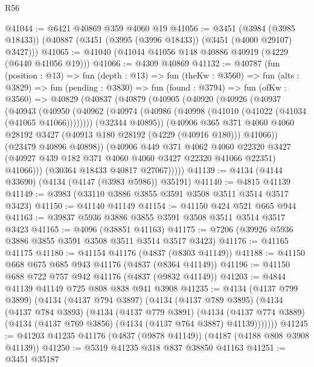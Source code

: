 \begin{lexlean}{R56}
\begin{coremodule}
@41044 := @6421 @40869 @359 @4060 @19
@41056 := @3451
    (@3984 (@3985 @18433))
    (@40887 (@3451 (@3995 (@3996 @18433)) (@3451 (@4000 @29107) @3427)))
@41065 := @41040 (@41044 @41056 @148 @40886 @40919 (@4229 (@6440 @41056 @19)))
@41066 := @4309 @40869
@41132 := @40787
    (fun (position : @13) =>
    fun (depth : @13) =>
    fun (theKw : @3560) =>
    fun (alts : @3829) =>
    fun (pending : @3830) =>
    fun (found : @3794) =>
    fun (ofKw : @3560) =>
    @40829
      (@40837
        (@40879
          (@40905
            (@40920
              (@40926
                (@40937
                  (@40943
                    (@40950
                      (@40962 (@40974 (@40986 (@40998 (@41010 (@41022 (@41034 (@41065 @41066))))))))
                      (@32344 @40895))
                    (@40906
                      @365
                      @371
                      @4060
                      @4060
                      @28192
                      @3427
                      (@40913 @180 @28192 (@4229 (@40916 @180)))
                      @41066))
                  (@23479 @40896 @40898))
                (@40906
                  @449
                  @371
                  @4062
                  @4060
                  @22320
                  @3427
                  (@40927 @439 @182 @371 @4060 @4060 @3427 @22320 @41066 @22351)
                  @41066)))
            (@30364 @18433 @40817 @27067)))))
@41139 := @4134 (@4144 @33690) (@4134 (@4147 (@3983 @5986)) @35191)
@41140 := @4815 @41139
@41149 := @3983 (@33110 @3886 @3855 @3591 @3508 @3511 @3514 @3517 @3423)
@41150 := @41140 @41149
@41154 := @41150 @424 @521 @665 @944
@41163 := @39837 @5936 @3886 @3855 @3591 @3508 @3511 @3514 @3517 @3423
@41165 := @4096 (@38851 @41163)
@41175 := @7206 (@39926 @5936 @3886 @3855 @3591 @3508 @3511 @3514 @3517 @3423)
@41176 := @41165 @41175
@41180 := @41154 @41176 (@4837 (@8303 @41149))
@41188 := @41150 @668 @675 @685 @943 @41176 (@4837 (@8364 @41149))
@41196 := @41150 @688 @722 @757 @942 @41176 (@4837 (@9832 @41149))
@41203 := @4844 @41139 @41149 @725 @808 @838 @941 @3908
@41235 := @4134
    (@4137 @799 @3899)
    (@4134
      (@4137 @794 @3897)
      (@4134
        (@4137 @789 @3895)
        (@4134
          (@4137 @784 @3893)
          (@4134
            (@4137 @779 @3891)
            (@4134
              (@4137 @774 @3889)
              (@4134 (@4137 @769 @3856) (@4134 (@4137 @764 @3887) @41139)))))))
@41245 := @41203 @41235 @41176 (@4837 (@9878 @41149)) (@4187 (@4188 @808 @3908 @41139))
@41250 := @5319 @41235 @318 @837 @38850 @41163
@41251 := @3451 @35187

\end{coremodule}
\end{lexlean}
